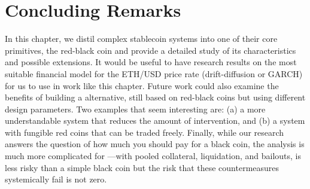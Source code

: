 
\section{Concluding Remarks}

In this chapter, we distil complex stablecoin systems into one of their core primitives, the red-black coin and provide a detailed study of its characteristics and possible extensions. It would be useful to have research results on the most suitable financial model for the ETH/USD price rate (\eg drift-diffusion or GARCH) for us to use in work like this chapter. Future work could also examine the benefits of building a \dai alternative, still based on red-black coins but using different design parameters. Two examples that seem interesting are: (a) a more understandable system that reduces the amount of intervention, and (b) a system with fungible red coins that can be traded freely. Finally, while our research answers the question of how much you should pay for a black coin, the analysis is much more complicated for \dai---with pooled collateral, liquidation, and bailouts, \dai is less risky than a simple black coin but the risk that these countermeasures systemically fail is not zero.
